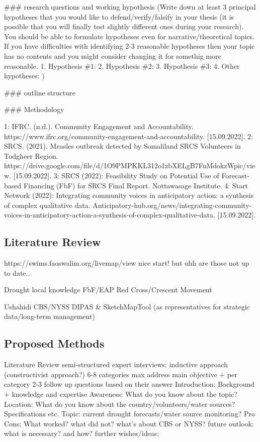 \#\#\# research questions and working hypothesis
(Write down at least 3 principal hypotheses that you would like to defend/verify/falsify in your thesis (it is possible that you will finally test slightly different ones during your research). You should be able to formulate hypotheses even for narrative/theoretical topics. If you have difficulties with identifying 2-3 reasonable hypotheses then your topic has no contents and you might consider changing it for somethig more reasonable.
1.	Hypothesis \#1:
2.	Hypothesis \#2:
3.	Hypothesis \#3:
4.	Other hypotheses:
)


\#\#\# outline structure


\#\#\# Methodology



1: IFRC. (n.d.). Community Engagement and Accountability. https://www.ifrc.org/community-engagement-and-accountability. [15.09.2022].
2: SRCS. (2021). Measles outbreak detected by Somaliland SRCS Volunteers in Todgheer Region. https://drive.google.com/file/d/1O9PMPKKL312o1zbXELgB7FuMdokzWpic/view. [15.09.2022].
3: SRCS (2022): Feasibility Study on Potential Use of Forecast-based Financing (FbF) for SRCS Final Report. Nottawasage Institute.
4: Start Network (2022): Integrating community voices in anticipatory action: a synthesis of complex qualitative data. Anticipatory-hub.org/news/integrating-community-voices-in-anticipatory-action-a-synthesis-of-complex-qualitative-data. [15.09.2022].


\subsection{Literature Review}
https://swims.faoswalim.org/livemap/view nice start! but uhh are those not up to date..

Drought
local knowledge
FbF/EAP
Red Cross/Crescent Movement

Ushahidi
CBS/NYSS
DIPAS \& SketchMapTool (as representatives for strategic data/long-term management)


\subsection{Proposed Methods}

Literature Review
semi-structured expert interviews: inductive approach (constructivist approach?)
6-8 categories max
address main objective + per category 2-3 follow up questions based on their answer
Introduction: Background + knowledge and expertise
Awareness: What do you know about the topic?
Location: What do you know about the country/volunteers/water sources? Specifications etc.
Topic: current drought forecasts/water source monitoring?
Pro Cons: What worked? what did not? what's about CBS or NYSS?
future outlook: what is necessary? and how?
further wishes/ideas:

